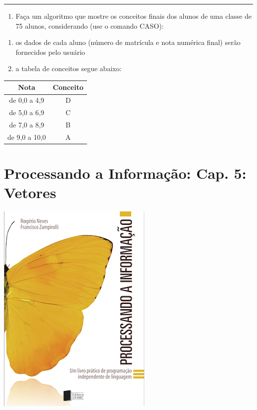 \documentclass[12pt,a4paper]{article}
\renewcommand{\linethickness}{0.05em}
\providecommand{\tightlist}{%
      \setlength{\itemsep}{0pt}\setlength{\parskip}{0pt}}
\begin{document}
    \begin{center}\rule{0.5\linewidth}{\linethickness}\end{center}

\begin{enumerate}
\def\labelenumi{\arabic{enumi}.}
\setcounter{enumi}{13}
\tightlist
\item
  Faça um algoritmo que mostre os conceitos finais dos alunos de uma
  classe de 75 alunos, considerando (use o comando CASO):
\end{enumerate}

\begin{enumerate}
\def\labelenumi{\alph{enumi})}
\item
  os dados de cada aluno (número de matrícula e nota numérica final)
  serão fornecidos pelo usuário
\item
  a tabela de conceitos segue abaixo:
\end{enumerate}

\begin{longtable}[]{@{}cc@{}}
\toprule
Nota & Conceito\tabularnewline
\midrule
\endhead
de 0,0 a 4,9 & D\tabularnewline
de 5,0 a 6,9 & C\tabularnewline
de 7,0 a 8,9 & B\tabularnewline
de 9,0 a 10,0 & A\tabularnewline
\bottomrule
\end{longtable}

    \hypertarget{processando-a-informauxe7uxe3o-cap.-5-vetores}{%
\section{Processando a Informação: Cap. 5:
Vetores}\label{processando-a-informauxe7uxe3o-cap.-5-vetores}}

    \includegraphics{"figs/Capa_Processando_Informacao.jpg"}
\end{document}
